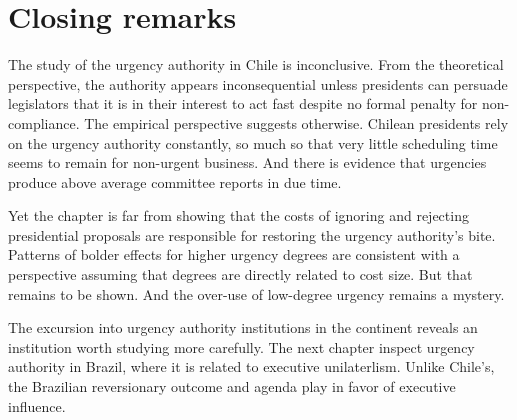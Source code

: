 \documentclass[letter,12pt]{article}
\begin{document}



\section{Closing remarks}

The study of the urgency authority in Chile is inconclusive. From the theoretical perspective, the authority appears inconsequential unless presidents can persuade legislators that it is in their interest to act fast despite no formal penalty for non-compliance. The empirical perspective suggests otherwise. Chilean presidents rely on the urgency authority constantly, so much so that very little scheduling time seems to remain for non-urgent business. And there is evidence that urgencies produce above average committee reports in due time. 

Yet the chapter is far from showing that the costs of ignoring and rejecting presidential proposals are responsible for restoring the urgency authority's bite. Patterns of bolder effects for higher urgency degrees are consistent with a perspective assuming that degrees are directly related to cost size. But that remains to be shown. And the over-use of low-degree urgency remains a mystery.

The excursion into urgency authority institutions in the continent reveals an institution worth studying more carefully. The next chapter inspect urgency authority in Brazil, where it is related to executive unilaterlism. Unlike Chile's, the Brazilian reversionary outcome and agenda play in favor of executive influence. 




\end{document}
